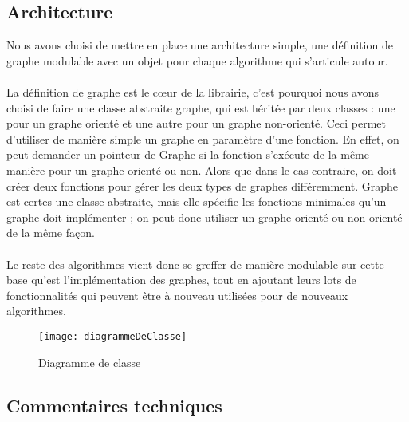 \begin{titlepage}
\newpage
\begin{center}
\begin{bf}
\section{Architecture}
\end{bf}
\end{center}

\vspace{1cm}
{
Nous avons choisi de mettre en place une architecture simple, une définition de graphe modulable avec un objet pour chaque algorithme qui s'articule autour.
\\ \\
La définition de graphe est le cœur de la librairie, c'est pourquoi nous avons choisi de faire une classe abstraite graphe, qui est héritée par deux classes : une pour un graphe orienté et une autre pour un graphe non-orienté. Ceci permet d'utiliser de manière simple un graphe en paramètre d'une fonction. En effet, on peut demander un pointeur de Graphe si la fonction s'exécute de la même manière pour un graphe orienté ou non. Alors que dans le cas contraire, on doit créer deux fonctions pour gérer les deux types de graphes différemment. Graphe est certes une classe abstraite, mais elle spécifie les fonctions minimales qu'un graphe doit implémenter ; on peut donc utiliser un graphe orienté ou non orienté de la même façon.
\\ \\
Le reste des algorithmes vient donc se greffer de manière modulable sur cette base qu'est l'implémentation des graphes, tout en ajoutant leurs lots de fonctionnalités qui peuvent être à nouveau utilisées pour de nouveaux algorithmes.
}



\newpage
{
\begin{figure}[!h]
\centering
\texttt{[image: diagrammeDeClasse]}
\caption{Diagramme de classe}
\end{figure}
}



\newpage
\begin{center}
\begin{bf}
\section{Commentaires techniques}
\end{bf}
\end{center}


\end{titlepage}
